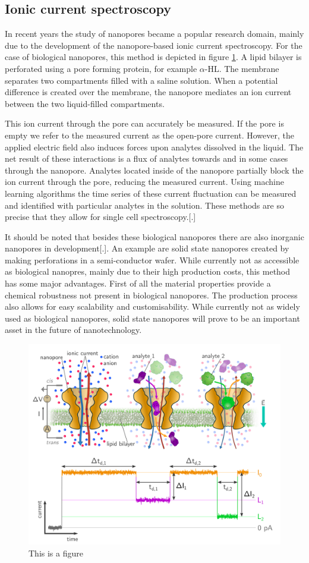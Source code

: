 \subsection{Ionic current spectroscopy}
In recent years the study of nanopores became a popular research domain, mainly
due to the development of the nanopore-based ionic current spectroscopy. For the case of
biological nanopores, this method is depicted in figure \ref{fig:IonicCurrentSpec}. A
lipid bilayer is perforated using a pore forming protein, for example $\alpha$-HL. The
membrane separates two compartments filled with a saline solution. When a potential
difference is created over the membrane, the nanopore mediates an ion current between the
two liquid-filled compartments.

This ion current through the pore can accurately be measured. If the pore is empty we
refer to the measured current as the open-pore current. However, the applied electric
field also induces forces upon analytes dissolved in the liquid. The net result of these
interactions is a flux of analytes towards and in some cases through the nanopore.
Analytes located inside of the nanopore partially block the ion current through the pore,
reducing the measured current. Using machine learning algorithms the time series of
these current fluctuation can be measured and identified with particular analytes in the
solution. These methods are so precise that they allow for single cell spectroscopy.[.]

It should be noted that besides these biological nanopores there are also inorganic
nanopores in development[.]. An example are solid state nanopores created by making
perforations in a semi-conductor wafer. While currently not as accessible as biological
nanopres, mainly due to their high production costs, this method has some major
advantages.  First of all the material properties provide a chemical robustness not
present in biological nanopores. The production process also allows for easy scalability
and customisability. While currently not as widely used as biological nanopores, solid
state nanopores will prove to be an important asset in the future of nanotechnology.

\begin{figure}[htpb]
  \centering
  \includegraphics[width=0.6\linewidth]{Figures/IonicCurrentSpec.png}
  \caption{This is a figure}
  \label{fig:IonicCurrentSpec}
\end{figure}
